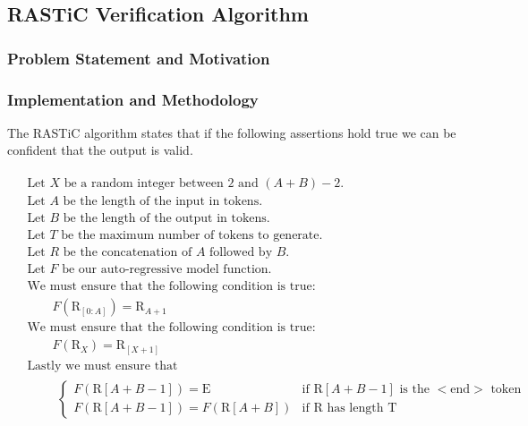 \documentclass{article}
\begin{document}
\subsection{RASTiC Verification Algorithm}
\subsubsection{Problem Statement and Motivation}
\subsubsection{Implementation and Methodology}
The RASTiC algorithm states that if the following assertions hold true we can be confident that the output is valid.

\begin{align*}
    \begin{aligned}
        &\text{Let } X \text{ be a random integer between 2 and } (A + B) - 2. \\
        &\text{Let }A\text{ be the length of the input in tokens.}\\
        &\text{Let }B\text{ be the length of the output in tokens.}\\
        &\text{Let }T\text{ be the maximum number of tokens to generate.}\\
        &\text{Let }R\text{ be the concatenation of }A\text{ followed by }B.\\
        &\text{Let }F\text{ be our auto-regressive model function.}\\
        &\text{We must ensure that the following condition is true:}\\
        &\qquad F(\text{R}_{[0:A]}) = \text{R}_{A+1} \\
        &\text{We must ensure that the following condition is true:} \\
        &\qquad F(\text{R}_X) = \text{R}_{[X+1]} \\
        &\text{Lastly we must ensure that} \\
        &\qquad \begin{aligned}
        \begin{cases}
            F(\text{R}{[A+B-1]}) = \text{E} & \text{if } \text{R}{[A+B-1]} \text{ is the }<\text{end}> \text{ token} \\
            F(\text{R}{[A+B-1]}) = F(\text{R}{[A+B]}) & \text{if } \text{R} \text{ has length } \text{T}
        \end{cases}
        \end{aligned}
    \end{aligned}
\end{align*}
\end{document}
